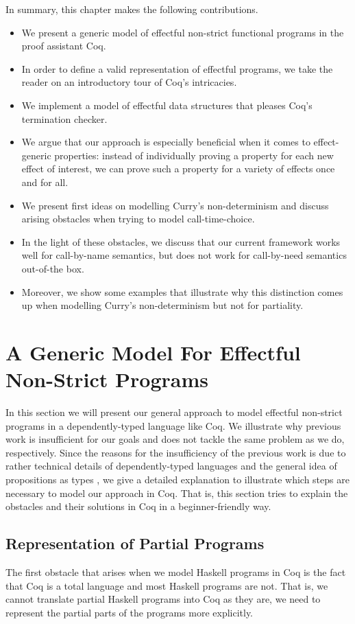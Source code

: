 In summary, this chapter makes the following contributions.

\begin{itemize}
\item We present a generic model of effectful non\--strict functional programs in the proof assistant Coq.
\item In order to define a valid representation of effectful programs, we take the reader on an introductory tour of Coq's intricacies.
\item We implement a model of effectful data structures that pleases Coq's termination checker.
\item We argue that our approach is especially beneficial when it comes to effect\--generic properties: instead of individually proving a property for each new effect of interest, we can prove such a property for a variety of effects once and for all.
\item We present first ideas on modelling Curry's non\--determinism and discuss arising obstacles when trying to model call\--time\--choice.
\item In the light of these obstacles, we discuss that our current framework works well for call\--by\--name semantics, but does not work for call\--by\--need semantics out\--of\--the box.
\item Moreover, we show some examples that illustrate why this distinction comes up when modelling Curry's non\--determinism but not for partiality.
\end{itemize}
 
\section{A Generic Model For Effectful Non\--Strict Programs}

In this section we will present our general approach to model effectful non\--strict programs in a dependently\--typed language like Coq.
We illustrate why previous work is insufficient for our goals and does not tackle the same problem as we do, respectively.
Since the reasons for the insufficiency of the previous work is due to rather technical details of dependently\--typed languages and the general idea of propositions as types \citep{wadler2015propositions}, we give a detailed explanation to illustrate which steps are necessary to model our approach in Coq.
That is, this section tries to explain the obstacles and their solutions in Coq in a beginner\--friendly way.

\subsection{Representation of Partial Programs}
\label{subsec:partial}
The first obstacle that arises when we model Haskell programs in Coq is the fact that Coq is a total language and most Haskell programs are not.
That is, we cannot translate partial Haskell programs into Coq as they are, we need to represent the partial parts of the programs more explicitly.

